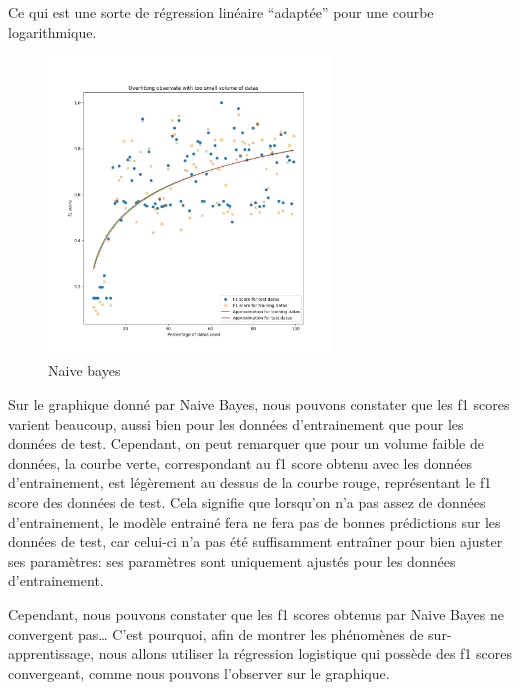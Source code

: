 \documentclass[
]{article}
\begin{document}
Ce qui est une sorte de régression linéaire ``adaptée'' pour une courbe
logarithmique.

\begin{figure}
\centering
\includegraphics[width=0.67\textwidth,height=\textheight]{../res/overfitting_naive.png}
\caption{Naive bayes}
\end{figure}

\newpage

Sur le graphique donné par Naive Bayes, nous pouvons constater que les
f1 scores varient beaucoup, aussi bien pour les données d'entrainement
que pour les données de test. Cependant, on peut remarquer que pour un
volume faible de données, la courbe verte, correspondant au f1 score
obtenu avec les données d'entrainement, est légèrement au dessus de la
courbe rouge, représentant le f1 score des données de test. Cela
signifie que lorsqu'on n'a pas assez de données d'entrainement, le
modèle entrainé fera ne fera pas de bonnes prédictions sur les données
de test, car celui-ci n'a pas été suffisamment entraîner pour bien
ajuster ses paramètres: ses paramètres sont uniquement ajustés pour les
données d'entrainement.

Cependant, nous pouvons constater que les f1 scores obtenus par Naive
Bayes ne convergent pas\ldots{} C'est pourquoi, afin de montrer les
phénomènes de sur-apprentissage, nous allons utiliser la régression
logistique qui possède des f1 scores convergeant, comme nous pouvons
l'observer sur le graphique.
\end{document}
